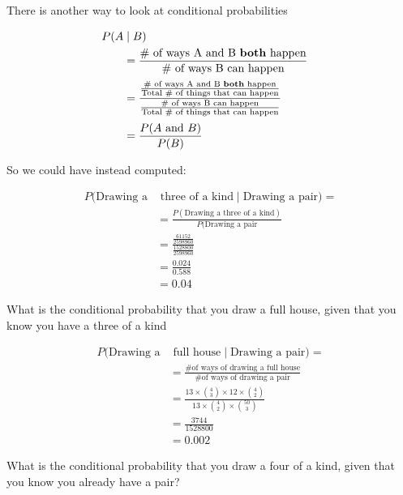 %
\begin{frame}

There is another way to look at conditional probabilities

\begin{align*}
P(A & \mid B) & \\
%
&= \frac{\text{\# of ways A and B \textbf{both} happen}}{\text{\#
of ways B can happen}} \\[0.5ex]
%
&= \frac{\frac{\text{\# of ways A and B \textbf{both} happen}}{\text{Total \# of
things that can happen}}}{\frac{\text{\# of ways B can happen}}{\text{Total \# of
things that can happen}}} \\[0.5ex]
%
&= \frac{P(A \text{ and } B)}{P(B)}
\end{align*}

\end{frame}
%

%
\begin{frame}

So we could have instead computed:

\begin{align*}
P(\text{Drawing a} & \text{ three of a kind} \mid \text{Drawing a pair}) = \\
%
&= \frac{P(\text{Drawing a three of a kind})}{P(\text{Drawing a pair}} \\
%
&= \frac{\frac{61152}{2598960}}{\frac{1528800}{2598960}} \\
%
&= \frac{0.024}{0.588} \\
%
&= 0.04
\end{align*}

\end{frame}
%

%
\begin{frame}

What is the conditional probability that you draw a full house, given that you know you
have a three of a kind

\begin{align*}
P(\text{Drawing a} & \text{ full house} \mid \text{Drawing a pair}) = \\
%
&= \frac{\text{\# of ways of drawing a full house}}{\text{\# of ways of drawing
a pair}} \\
%
&= \frac{ 13 \times {{4}\choose{3}} \times 12 \times {{4}\choose{2}} } {13
\times {{4}\choose{2}} \times {{50}\choose{3}}} \\
%
%
&= \frac{3744}{1528800} \\
%
&= 0.002
\end{align*}

\end{frame}
%

%
\begin{frame}
What is the conditional probability that you draw a four of a kind, given that
you know you already have a pair?
\end{frame}
